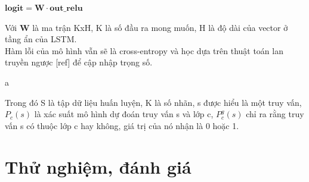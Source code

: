 \documentclass[fontsize=12pt]{scrartcl}
\begin{document}
\begin{center}
$\boldsymbol{logit} = \boldsymbol{W}\cdot\boldsymbol{out\_relu}$\\
\end{center}
Với $\boldsymbol{W}$ là ma trận KxH, K là số đầu ra mong muốn, H là độ dài của vector ở tầng ẩn của LSTM.\\
Hàm lỗi của mô hình vẫn sẽ là cross-entropy và học dựa trên thuật toán lan truyền ngược [ref] để cập nhập trọng số.
\begin{center}
a
\end{center}
Trong đó S là tập dữ liệu huấn luyện, K là số nhãn, s được hiểu là một truy vấn, $P_c(s)$ là xác suất mô hình dự đoán truy vấn s và lớp c, $P_c^g(s)$ chỉ ra rằng truy vấn s có thuộc lớp c hay không, giá trị của nó nhận là 0 hoặc 1.
\section{Thử nghiệm, đánh giá}\label{sec:exp}
\end{document}

